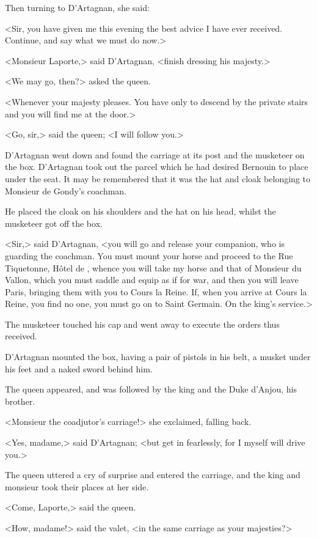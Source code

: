 Then turning to D'Artagnan, she said:

<Sir, you have given me this evening the best advice I have ever received. Continue, and say what we must do now.>

<Monsieur Laporte,> said D'Artagnan, <finish dressing his majesty.>

<We may go, then?> asked the queen.

<Whenever your majesty pleases. You have only to descend by the private stairs and you will find me at the door.>

<Go, sir,> said the queen; <I will follow you.>

D'Artagnan went down and found the carriage at its post and the musketeer on the box. D'Artagnan took out the parcel which he had desired Bernouin to place under the seat. It may be remembered that it was the hat and cloak belonging to Monsieur de Gondy's coachman.

He placed the cloak on his shoulders and the hat on his head, whilst the musketeer got off the box.

<Sir,> said D'Artagnan, <you will go and release your companion, who is guarding the coachman. You must mount your horse and proceed to the Rue Tiquetonne, Hôtel de , whence you will take my horse and that of Monsieur du Vallon, which you must saddle and equip as if for war, and then you will leave Paris, bringing them with you to Cours la Reine. If, when you arrive at Cours la Reine, you find no one, you must go on to Saint Germain. On the king's service.>

The musketeer touched his cap and went away to execute the orders thus received.

D'Artagnan mounted the box, having a pair of pistols in his belt, a musket under his feet and a naked sword behind him.

The queen appeared, and was followed by the king and the Duke d'Anjou, his brother.

<Monsieur the coadjutor's carriage!> she exclaimed, falling back.

<Yes, madame,> said D'Artagnan; <but get in fearlessly, for I myself will drive you.>

The queen uttered a cry of surprise and entered the carriage, and the king and monsieur took their places at her side.

<Come, Laporte,> said the queen.

<How, madame!> said the valet, <in the same carriage as your majesties?>

